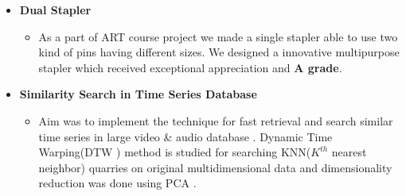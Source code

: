 \documentclass[]{res}
\makeatletter
\newcommand{\resitem}[1]{\item #1 \vspace{-2pt}}
\newcommand{\ressubheading}[4]{
\begin{tabular*}{6.5in}{l@{\extracolsep{\fill}}r}
		\textbf{#1} & #2 \\
		\textit{#3} & \textit{#4} \\
\end{tabular*}\vspace{-6pt}}
\makeatother
\begin{document}
\begin{itemize}
		\vspace{-0.1in}
			\item \textbf{Dual Stapler }	
		\vspace{-0.1in}
		\begin{itemize}
		\resitem{As a part of ART course project we made a single stapler able to use two kind of pins having different sizes. We designed a innovative multipurpose stapler which received exceptional appreciation and  \textbf{A grade}.}
		\end{itemize}	
		

		\vspace{-0.1in}	
		\item \textbf{Similarity Search in Time Series Database }
	\vspace{-0.1in}
		\begin{itemize}
		\resitem{Aim was to implement the technique for fast retrieval and search similar time series  in large video \& audio database .  Dynamic Time Warping(DTW ) method is studied for searching  KNN($K^{th }$ nearest neighbor) quarries on original multidimensional data and dimensionality reduction was done using PCA .}
		
		\end{itemize}		



\end{itemize}
\end{document}
